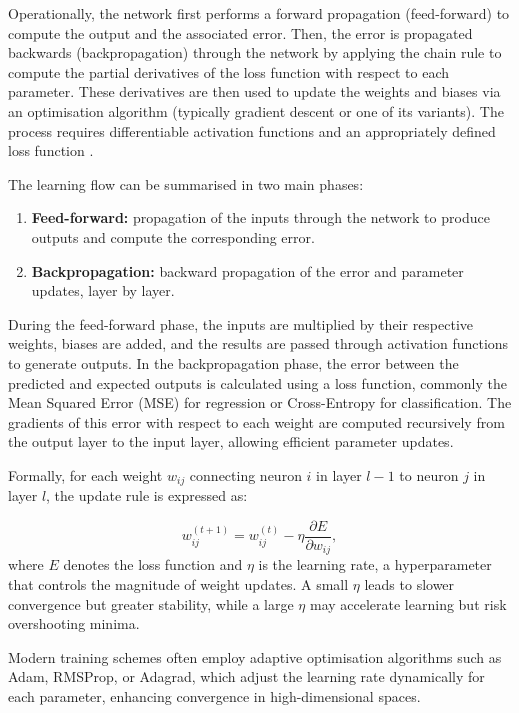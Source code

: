 Operationally, the network first performs a forward propagation (feed-forward) to compute the output and the associated error.  
Then, the error is propagated backwards (backpropagation) through the network by applying the chain rule to compute the partial derivatives of the loss function with respect to each parameter.  
These derivatives are then used to update the weights and biases via an optimisation algorithm (typically gradient descent or one of its variants).  
The process requires differentiable activation functions and an appropriately defined loss function \cite{Rojas1996}.

The learning flow can be summarised in two main phases:

\begin{enumerate}
    \item \textbf{Feed-forward:} propagation of the inputs through the network to produce outputs and compute the corresponding error.
    \item \textbf{Backpropagation:} backward propagation of the error and parameter updates, layer by layer.
\end{enumerate}

During the feed-forward phase, the inputs are multiplied by their respective weights, biases are added, and the results are passed through activation functions to generate outputs.  
In the backpropagation phase, the error between the predicted and expected outputs is calculated using a loss function, commonly the Mean Squared Error (MSE) for regression or Cross-Entropy for classification.  
The gradients of this error with respect to each weight are computed recursively from the output layer to the input layer, allowing efficient parameter updates.

Formally, for each weight \( w_{ij} \) connecting neuron \( i \) in layer \( l-1 \) to neuron \( j \) in layer \( l \), the update rule is expressed as:

\[
    w_{ij}^{(t+1)} = w_{ij}^{(t)} - \eta \frac{\partial E}{\partial w_{ij}},
\]
where \( E \) denotes the loss function and \( \eta \) is the learning rate, a hyperparameter that controls the magnitude of weight updates.  
A small \( \eta \) leads to slower convergence but greater stability, while a large \( \eta \) may accelerate learning but risk overshooting minima.

Modern training schemes often employ adaptive optimisation algorithms such as Adam, RMSProp, or Adagrad, which adjust the learning rate dynamically for each parameter, enhancing convergence in high-dimensional spaces.

